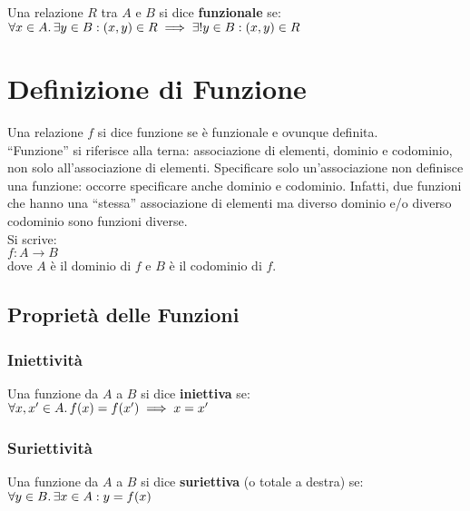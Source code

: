 \documentclass[a4paper, twoside, italian, 11pt]{book}
\begin{document}
Una relazione $R$ tra $A$ e $B$ si dice \textbf{funzionale} se: \\

$\forall x \in A \ldotp \exists y \in B : (x, y) \in R \implies \exists! y \in B : (x, y) \in R$



\section{Definizione di Funzione}

Una relazione $f$ si dice funzione se è funzionale e ovunque definita. \\

\noindent
``Funzione'' si riferisce alla terna: associazione di elementi, dominio e codominio, non solo all'associazione di elementi. Specificare solo un'associazione non definisce una funzione: occorre specificare anche dominio e codominio. Infatti, due funzioni che hanno una ``stessa'' associazione di elementi ma diverso dominio e/o diverso codominio sono funzioni diverse. \\

\noindent
Si scrive: \\
$f : A \rightarrow B$ \\
dove $A$ è il dominio di $f$ e $B$ è il codominio di $f$.


\subsection{Proprietà delle Funzioni}


\subsubsection{Iniettività}

Una funzione da $A$ a $B$ si dice \textbf{iniettiva} se: \\

$\forall x, x' \in A \ldotp f(x) = f(x') \implies x = x'$


\subsubsection{Suriettività}

Una funzione da $A$ a $B$ si dice \textbf{suriettiva} (o totale a destra) se: \\

$\forall y \in B \ldotp \exists x \in A : y = f(x)$ \\
\end{document}
